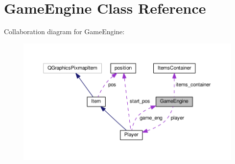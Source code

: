 \hypertarget{class_game_engine}{}\section{Game\+Engine Class Reference}
\label{class_game_engine}


Collaboration diagram for Game\+Engine\+:\nopagebreak
\begin{figure}[H]
\begin{center}
\leavevmode
\includegraphics[width=350pt]{class_game_engine__coll__graph}
\end{center}
\end{figure}
